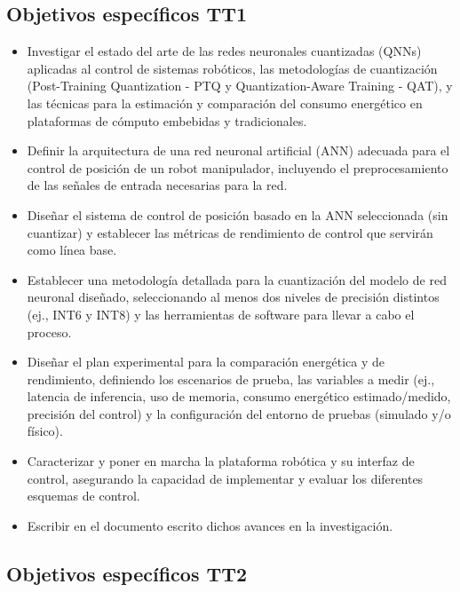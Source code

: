 \documentclass[12pt]{article}
\begin{document}
\subsection{Objetivos específicos TT1}

\begin{itemize}
    \item Investigar el estado del arte de las redes neuronales cuantizadas (QNNs) aplicadas al control de sistemas robóticos, las metodologías de cuantización (Post-Training Quantization - PTQ y Quantization-Aware Training - QAT), y las técnicas para la estimación y comparación del consumo energético en plataformas de cómputo embebidas y tradicionales.
    \item Definir la arquitectura de una red neuronal artificial (ANN) adecuada para el control de posición de un robot manipulador, incluyendo el preprocesamiento de las señales de entrada necesarias para la red.
    \item Diseñar el sistema de control de posición basado en la ANN seleccionada (sin cuantizar) y establecer las métricas de rendimiento de control que servirán como línea base.
    \item Establecer una metodología detallada para la cuantización del modelo de red neuronal diseñado, seleccionando al menos dos niveles de precisión distintos (ej., INT6 y INT8) y las herramientas de software para llevar a cabo el proceso. 
    \item Diseñar el plan experimental para la comparación energética y de rendimiento, definiendo los escenarios de prueba, las variables a medir (ej., latencia de inferencia, uso de memoria, consumo energético estimado/medido, precisión del control) y la configuración del entorno de pruebas (simulado y/o físico).
    \item Caracterizar y poner en marcha la plataforma robótica y su interfaz de control, asegurando la capacidad de implementar y evaluar los diferentes esquemas de control.
    \item Escribir en el documento escrito dichos avances en la investigación.
    
\end{itemize}

\subsection{Objetivos específicos TT2}
 
\end{document}
